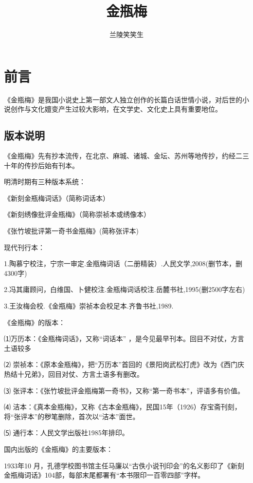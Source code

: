 \documentclass[a4paper,12pt,UTF8,twoside]{ctexbook}
\title{\heiti\zihao{0} 金瓶梅}
\author{兰陵笑笑生}
\date{}
\begin{document}
\maketitle
\tableofcontents

\frontmatter
\chapter{前言}

《金瓶梅》是我国小说史上第一部文人独立创作的长篇白话世情小说，对后世的小说创作与文化嬗变产生过较大影响，在文学史、文化史上具有重要地位。

\section{版本说明}

《金瓶梅》先有抄本流传，在北京、麻城、诸城、金坛、苏州等地传抄，约经二三十年的传抄后始有刊本。

明清时期有三种版本系统：

《新刻金瓶梅词话》（简称词话本）

《新刻绣像批评金瓶梅》（简称崇祯本或绣像本）

《张竹坡批评第一奇书金瓶梅》(简称张评本)

现代刊行本：

1.陶慕宁校注，宁宗一审定.金瓶梅词话（二册精装）.人民文学,2008(删节本，删4300字)

2.冯其庸顾问，白维国、卜健校注.金瓶梅词话校注.岳麓书社,1995(删2500字左右)

3.王汝梅会校.《金瓶梅》崇祯本会校足本.齐鲁书社,1989.

《金瓶梅》的版本：

⑴万历本：《金瓶梅词话》，又称“词话本” ，是今见最早刊本。回目不对仗，方言土语较多

⑵ 崇祯本：《原本金瓶梅》，把“万历本”首回的《景阳岗武松打虎》改为《西门庆热结十兄弟》，回目对仗、方言土语多有删改。

⑶ 张评本：《张竹坡批评金瓶梅第一奇书》，又称“第一奇书本”，评语多有价值。

⑷ 洁本：《真本金瓶梅》，又称《古本金瓶梅》，民国15年（1926）存宝斋刊刻，将“张评本”的秽笔删除，首次以“洁本”面世。

⑸ 通行本：人民文学出版社1985年排印。

国内出版的《金瓶梅》的主要版本：

1933年10 月，孔德学校图书馆主任马廉以“古佚小说刊印会”的名义影印了《新刻金瓶梅词话》104部，每部末尾都署有“本书限印一百零四部”字样。
\end{document}
